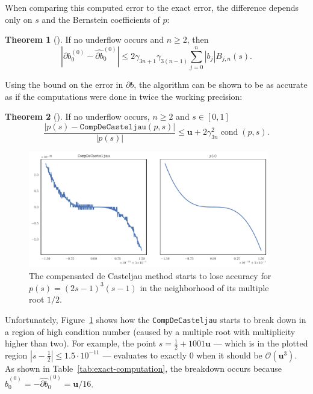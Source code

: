 \documentclass[letterpaper,10pt]{article}
\theoremstyle{definition}
\newtheorem{theorem}{Theorem}
\newcommand{\cond}[1]{\operatorname{cond}\left(#1\right)}
\newcommand{\mach}{\mathbf{u}}
\begin{document}
\noindent  When comparing this computed error to the exact error, the
difference depends only on \(s\) and the Bernstein
coefficients of \(p\):

\begin{theorem}[\cite{Jiang2010}]
  If no underflow occurs and \(n \geq 2\), then
  \begin{equation}
    \left|\partial b_0^{(0)} - \widehat{\partial b}_0^{(0)}\right| \leq
    2 \gamma_{3n + 1} \gamma_{3(n - 1)}
    \sum_{j = 0}^n \left|b_j\right| B_{j, n}(s).
  \end{equation}
\end{theorem}

\noindent Using the bound on the error in \(\partial b\), the algorithm can
be shown to be as accurate as if the computations were done in twice
the working precision:

\begin{theorem}[\cite{Jiang2010}]
  If no underflow occurs, \(n \geq 2\) and \(s \in \left[0, 1\right]\)
  \begin{equation}
    \frac{\left|p(s) - \mathtt{CompDeCasteljau}(p, s)\right|}{\left|p(s)\right|} \leq \mach +
    2 \gamma_{3n}^2 \cond{p, s}.
  \end{equation}
\end{theorem}

\begin{figure}
  \includegraphics[width=0.9375\textwidth]{../images/compensated_insufficient.pdf}
  \centering
  \captionsetup{width=.75\linewidth}
  \caption{The compensated de Casteljau method starts to lose accuracy
    for \(p(s) = (2s - 1)^3 (s - 1)\) in the neighborhood of its
    multiple root \(1/2\).}
  \label{fig:compensated-insufficient}
\end{figure}

Unfortunately, Figure~\ref{fig:compensated-insufficient} shows how
the \texttt{CompDeCasteljau} starts to break down in a region of
high condition number (caused by a multiple root with multiplicity
higher than two). For example, the point
\(s = \frac{1}{2} + 1001\mach\)
--- which is in the plotted region \(\left|s - \frac{1}{2}\right|
\leq 1.5 \cdot 10^{-11}\) --- evaluates to exactly \(0\) when it should be
\(\mathcal{O}\left(\mach^3\right)\). As shown in
Table~\ref{tab:exact-computation}, the breakdown occurs because
\(\widehat{b}_0^{(0)} = -\widehat{\partial b}_0^{(0)} = \mach / 16\).
\end{document}
